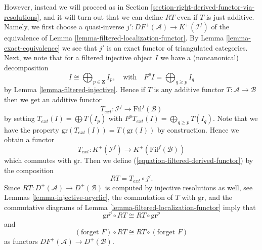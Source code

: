 \medskip\noindent
However, instead we will proceed as in
Section \ref{section-right-derived-functor-via-resolutions},
and it will turn out that we can define $RT$ even if $T$ is just additive.
Namely, we first choose a quasi-inverse
$j' : DF^{+}(\mathcal{A}) \to K^{+}(\mathcal{I}^f)$ of the
equivalence of
Lemma \ref{lemma-filtered-localization-functor}.
By
Lemma \ref{lemma-exact-equivalence}
we see that $j'$ is an exact functor of triangulated categories.
Next, we note that for a filtered injective object $I$ we have
a (noncanonical) decomposition
\begin{equation}
\label{equation-decompose}
I \cong \bigoplus\nolimits_{p \in \mathbf{Z}} I_p,
\quad\text{with}\quad
F^pI = \bigoplus\nolimits_{q \geq p} I_q
\end{equation}
by
Lemma \ref{lemma-filtered-injective}.
Hence if $T$ is any additive functor $T : \mathcal{A} \to \mathcal{B}$
then we get an additive functor
\begin{equation}
\label{equation-extend-T}
T_{ext} : \mathcal{I}^f \to \text{Fil}^f(\mathcal{B})
\end{equation}
by setting $T_{ext}(I) = \bigoplus T(I_p)$ with
$F^pT_{ext}(I) = \bigoplus_{q \geq p} T(I_q)$. Note that we have the
property $\text{gr}(T_{ext}(I)) = T(\text{gr}(I))$ by construction.
Hence we obtain a functor
\begin{equation}
\label{equation-extend-T-complexes}
T_{ext} : K^{+}(\mathcal{I}^f) \to K^{+}(\text{Fil}^f(\mathcal{B}))
\end{equation}
which commutes with $\text{gr}$. Then we define
(\ref{equation-filtered-derived-functor}) by the composition
\begin{equation}
\label{equation-definition-filtered-derived-functor}
RT = T_{ext} \circ j'.
\end{equation}
Since $RT : D^{+}(\mathcal{A}) \to D^{+}(\mathcal{B})$ is computed
by injective resolutions as well, see
Lemmas \ref{lemma-injective-acyclic},
the commutation of $T$ with $\text{gr}$, and the commutative diagrams of
Lemma \ref{lemma-filtered-localization-functor}
imply that
\begin{equation}
\label{equation-commute-gr}
\text{gr}^p \circ RT \cong RT \circ \text{gr}^p
\end{equation}
and
\begin{equation}
\label{equation-commute-forget}
(\text{forget }F) \circ RT \cong RT \circ (\text{forget }F)
\end{equation}
as functors $DF^{+}(\mathcal{A}) \to D^{+}(\mathcal{B})$.

